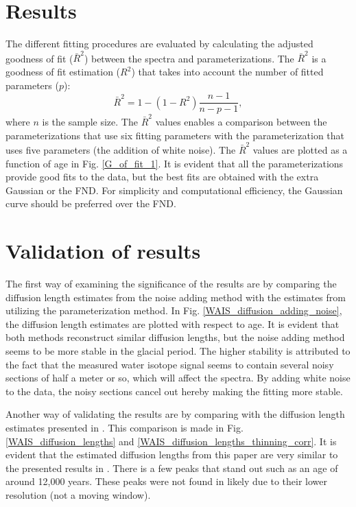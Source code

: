 \documentclass[draft, jgrga]{AGUTeX}
\begin{document}
\begin{article}
\section{Results}
The different fitting procedures are evaluated by calculating the adjusted goodness of fit ($\bar{R}^2$) between the spectra and parameterizations. The $\bar{R}^2$ is a goodness of fit estimation ($R^2$) that takes into account the number of fitted parameters ($p$):
\begin{equation}
\bar{R}^2 = 1 - (1 -R^2) \frac{n - 1}{n - p - 1},
\end{equation}
where $n$ is the sample size.
The $\bar{R}^2$ values enables a comparison between the parameterizations that use six fitting parameters with
the parameterization that uses five parameters (the addition of white noise).
The $\bar{R}^2$ values are plotted as a function of age in Fig. \ref{G_of_fit_1}.
It is evident that all the parameterizations provide good fits to the data,
but the best fits are obtained with the extra Gaussian or the FND.
For simplicity and computational efficiency, the Gaussian curve should be preferred over the FND.


\section{Validation of results}
The first way of examining the significance of the results are by comparing the diffusion length estimates from the
noise adding method with the estimates from utilizing the parameterization method.
In Fig. \ref{WAIS_diffusion_adding_noise}, the diffusion length estimates are plotted with respect to age.
It is evident that both methods reconstruct similar diffusion lengths, but the noise adding method seems to be
more stable in the glacial period. The higher stability is attributed to the fact that the measured water isotope signal
seems to contain several noisy sections of half a meter or so, which will affect the spectra.
By adding white noise to the data, the noisy sections cancel out hereby making the fitting more stable.

Another way of validating the results are by comparing with the diffusion length estimates presented in \cite{Jones2016}.
This comparison is made in Fig. \ref{WAIS_diffusion_lengths} and \ref{WAIS_diffusion_lengths_thinning_corr}.
It is evident that the estimated diffusion lengths from this paper are very similar to the presented results in \cite{Jones2016}.
There is a few peaks that stand out such as an age of around 12,000 years. These peaks were not found in \cite{Jones2016} likely due
to their lower resolution (not a moving window).



\end{article}
\end{document}
